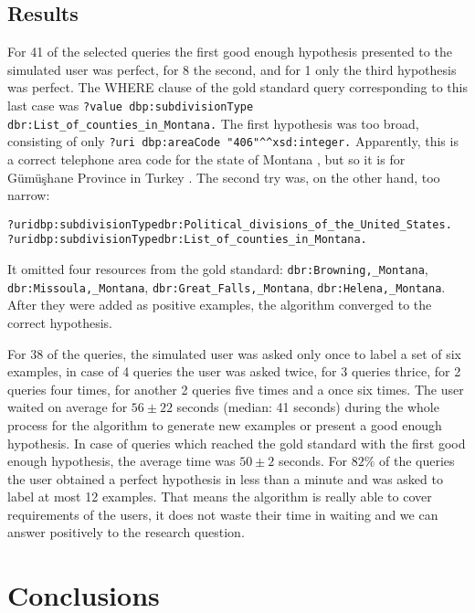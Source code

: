 \documentclass{llncs}
\newcommand{\typedliteral}{\textasciicircum\textasciicircum}
\begin{document}
\subsection{Results}

For 41 of the selected queries the first good enough hypothesis presented to the simulated user was perfect, for 8 the second, and for 1 only the third hypothesis was perfect.
The WHERE clause of the gold standard query corresponding to this last case was
\texttt{?value dbp:subdivisionType dbr:List\_of\_counties\_in\_Montana.}
The first hypothesis was too broad, consisting of only \texttt{?uri dbp:areaCode "406"\typedliteral{}xsd:integer.}
Apparently, this is a correct telephone area code for the state of Montana \cite{wiki:montana}, but so it is for Gümüşhane Province in Turkey \cite{wiki:turkey}.
The second try was, on the other hand, too narrow:
{
\small
\begin{alltt}
?uri dbp:subdivisionType dbr:Political_divisions_of_the_United_States .
?uri dbp:subdivisionType dbr:List_of_counties_in_Montana .
\end{alltt}
}
It omitted four resources from the gold standard: \texttt{dbr:Browning,\_Montana}, \texttt{dbr:Missoula,\_Montana}, \texttt{dbr:Great\_Falls,\_Montana}, \texttt{dbr:Helena,\_Montana}.
After they were added as positive examples, the algorithm converged to the correct hypothesis.

For 38 of the queries, the simulated user was asked only once to label a set of six examples, in case of 4 queries the user was asked twice, for 3 queries thrice, for 2 queries four times, for another 2 queries five times and a once six times.
The user waited on average for $56\pm 22$ seconds (median: 41 seconds) during the whole process for the algorithm to generate new examples or present a good enough hypothesis.
In case of queries which reached the gold standard with the first good enough hypothesis, the average time was $50\pm 2$ seconds.
For $82\%$ of the queries the user obtained a perfect hypothesis in less than a minute and was asked to label at most 12 examples. 
That means the algorithm is really able to cover requirements of the users, it does not waste their time in waiting and we can answer positively to the research question.



\section{Conclusions}
\end{document}

